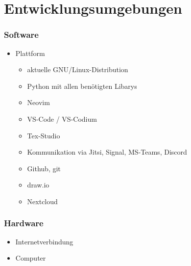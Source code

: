 \chapter{Entwicklungsumgebungen}

\subsection{Software}

\begin{itemize}
	\item Plattform
		\begin{itemize}
			\item aktuelle GNU/Linux-Distribution
			\item Python mit allen benötigten Libarys
		\end{itemize}

		\begin{itemize}
			\item Neovim
			\item VS-Code / VS-Codium
			\item Tex-Studio
			\item Kommunikation via Jitsi, Signal, MS-Teams, Discord
			\item Github, git
			\item draw.io
			\item Nextcloud
		\end{itemize}
\end{itemize}

\subsection{Hardware}

\begin{itemize}
	\item Internetverbindung
	\item Computer
\end{itemize}
